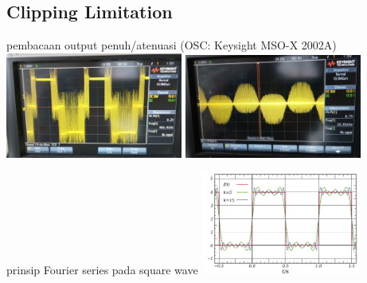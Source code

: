 \documentclass[table,dvipsnames]{beamer}
\begin{document}
	\begin{frame}
		\subsection{Clipping Limitation}
		\begin{exampleblock}{pembacaan output penuh/atenuasi (OSC: Keysight MSO-X 2002A)}
			\includegraphics[width=165pt]{images/sinefull_osc}
			\includegraphics[width=165pt]{images/sine_osc}
		\end{exampleblock}

		\begin{exampleblock}{prinsip Fourier series pada square wave}
			\centering
			\includegraphics[width=150pt]{images/square_wave_fourier}
		\end{exampleblock}
	\end{frame}
\end{document}
